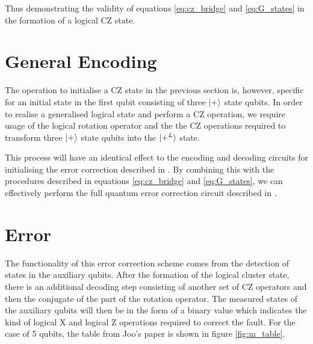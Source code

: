 Thus demonstrating the validity of equations \eqref{eq:cz_bridge} and \eqref{eq:G_states} in the formation of a logical CZ state.


\section{General Encoding}

The operation to initialise a CZ state in the previous section is, however, specific for an initial state in the first qubit consisting of three $\ket{+}$ state qubits. In order to realise a generalised logical state and perform a CZ operation, we require usage of the logical rotation operator and the the CZ operations required to transform three $\ket{+}$ state qubits into the $\ket{+^{L}}$ state. 

This process will have an identical effect to the encoding and decoding circuits for initialising the error correction described in \citep{joo_error-correcting_2009}. By combining this with the procedures described in equations \eqref{eq:cz_bridge} and \eqref{eq:G_states}, we can effectively perform the full quantum error correction circuit described in \citep{joo_error-correcting_2009}.


\section{Error}

The functionality of this error correction scheme comes from the detection of states in the auxiliary qubits. After the formation of the logical cluster state, there is an additional decoding step consisting of another set of CZ operators and then the conjugate of the part of the rotation operator. The measured states of the auxiliary qubits will then be in the form of a binary value which indicates the kind of logical X and logical Z operations required to correct the fault. For the case of 5 qubits, the table from Joo's paper \citep{joo_error-correcting_2009} is shown in figure \ref{fig:m_table}.

